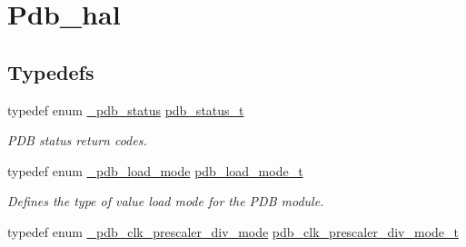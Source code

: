 \hypertarget{group__pdb__hal}{}\section{Pdb\+\_\+hal}
\label{group__pdb__hal}
\subsection*{Typedefs}
\begin{DoxyCompactItemize}
\item 
typedef enum \hyperlink{group__pdb__hal_gaa17da678ec0a92f7c1dd0dfa2a58717f}{\+\_\+pdb\+\_\+status} \hyperlink{group__pdb__hal_gab056cd14ac826acc9cf93f7d7600d103}{pdb\+\_\+status\+\_\+t}\hypertarget{group__pdb__hal_gab056cd14ac826acc9cf93f7d7600d103}{}\label{group__pdb__hal_gab056cd14ac826acc9cf93f7d7600d103}

\begin{DoxyCompactList}\small\item\em P\+DB status return codes. \end{DoxyCompactList}\item 
typedef enum \hyperlink{group__pdb__hal_ga24cd30e248ca866cb85a353b2c69ac65}{\+\_\+pdb\+\_\+load\+\_\+mode} \hyperlink{group__pdb__hal_gaee15374478afc65a8d15ee4b5e1fdd44}{pdb\+\_\+load\+\_\+mode\+\_\+t}
\begin{DoxyCompactList}\small\item\em Defines the type of value load mode for the P\+DB module. \end{DoxyCompactList}\item 
typedef enum \hyperlink{group__pdb__hal_gaf0f364ab5a47793544fdd1b60438a1ef}{\+\_\+pdb\+\_\+clk\+\_\+prescaler\+\_\+div\+\_\+mode} \hyperlink{group__pdb__hal_ga5a21fc27e1ab395e71229c49d5426fe2}{pdb\+\_\+clk\+\_\+prescaler\+\_\+div\+\_\+mode\+\_\+t}\hypertarget{group__pdb__hal_ga5a21fc27e1ab395e71229c49d5426fe2}{}\label{group__pdb__hal_ga5a21fc27e1ab395e71229c49d5426fe2}


\end{DoxyCompactItemize}
